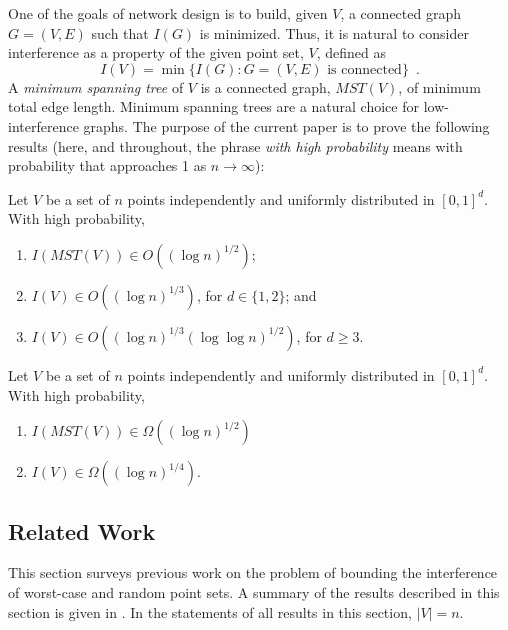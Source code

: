 \documentclass{patmorin}
\newcommand{\mst}{\mathit{MST}}
\begin{document}
One of the goals of network design is to build, given $V$, a connected
graph $G=(V,E)$ such that $I(G)$ is minimized.  Thus, it is natural to consider interference as a property of the given point set, $V$, defined as
\[
  I(V) = \min\{I(G) : \mbox{$G=(V,E)$ is connected}\} \enspace .
\]
A \emph{minimum spanning tree} of $V$ is a connected graph, $\mst(V)$,
of minimum total edge length.  Minimum spanning trees are a natural
choice for low-interference graphs.  The purpose of the current paper
is to prove the following results (here, and throughout, the phrase
\emph{with high probability} means with probability that approaches 1
as $n\rightarrow\infty$):
\begin{thm}
  Let $V$ be a set of $n$ points independently and uniformly distributed
  in $[0,1]^d$.  With high probability,
\begin{enumerate}
  \item  $I(\mst(V))\in O((\log n)^{1/2})$;
  \item  $I(V)\in O((\log n)^{1/3})$, for $d\in\{1,2\}$; and 
  \item $I(V)\in O((\log n)^{1/3}(\log\log n)^{1/2})$, for $d\ge 3$.
\end{enumerate}
\end{thm}
\begin{thm}
  Let $V$ be a set of $n$ points independently and uniformly distributed
  in $[0,1]^d$.  With high probability, 
\begin{enumerate}
  \item $I(\mst(V))\in\Omega((\log n)^{1/2})$ 
  \item $I(V)\in \Omega((\log n)^{1/4})$.
\end{enumerate}
\end{thm}
\setcounter{thm}{3}

\subsection{Related Work}

This section surveys previous work on the problem of bounding the
interference of worst-case and random point sets.  A summary of the
results described in this section is given in .  In the
statements of all results in this section, $|V|=n$.
\end{document}
